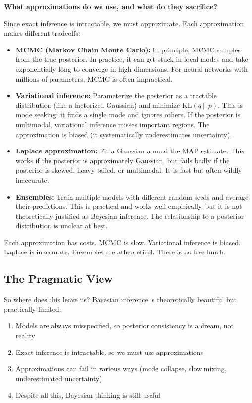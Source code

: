 \vspace{1.5em}

\textbf{What approximations do we use, and what do they sacrifice?}

Since exact inference is intractable, we must approximate. Each approximation makes different tradeoffs:

\begin{itemize}
\item \textbf{MCMC (Markov Chain Monte Carlo):} In principle, MCMC samples from the true posterior. In practice, it can get stuck in local modes and take exponentially long to converge in high dimensions. For neural networks with millions of parameters, MCMC is often impractical.

\item \textbf{Variational inference:} Parameterize the posterior as a tractable distribution (like a factorized Gaussian) and minimize $\text{KL}(q \| p)$. This is mode seeking: it finds a single mode and ignores others. If the posterior is multimodal, variational inference misses important regions. The approximation is biased (it systematically underestimates uncertainty).

\item \textbf{Laplace approximation:} Fit a Gaussian around the MAP estimate. This works if the posterior is approximately Gaussian, but fails badly if the posterior is skewed, heavy tailed, or multimodal. It is fast but often wildly inaccurate.

\item \textbf{Ensembles:} Train multiple models with different random seeds and average their predictions. This is practical and works well empirically, but it is not theoretically justified as Bayesian inference. The relationship to a posterior distribution is unclear at best.
\end{itemize}

Each approximation has costs. MCMC is slow. Variational inference is biased. Laplace is inaccurate. Ensembles are atheoretical. There is no free lunch.

\subsection{The Pragmatic View}

So where does this leave us? Bayesian inference is theoretically beautiful but practically limited:

\begin{enumerate}
\item Models are always misspecified, so posterior consistency is a dream, not reality
\item Exact inference is intractable, so we must use approximations
\item Approximations can fail in various ways (mode collapse, slow mixing, underestimated uncertainty)
\item Despite all this, Bayesian thinking is still useful
\end{enumerate}

